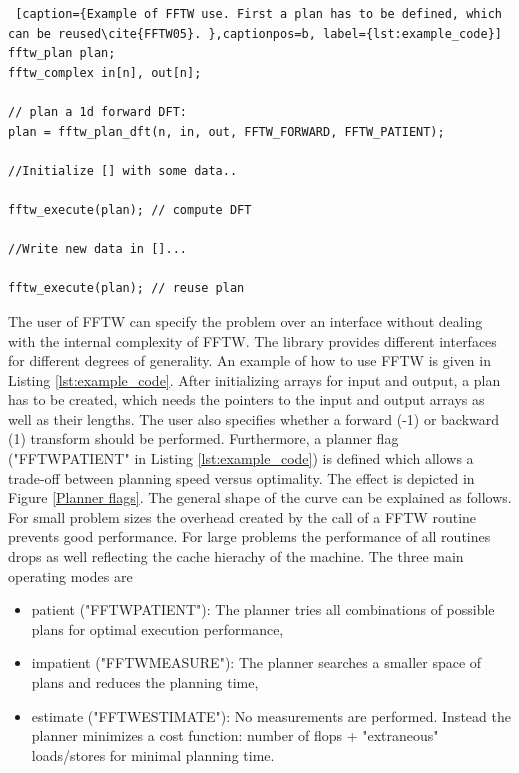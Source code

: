 \documentclass{usiinftr}
\begin{document}
\begin{lstlisting} [caption={Example of FFTW use. First a plan has to be defined, which can be reused\cite{FFTW05}. },captionpos=b, label={lst:example_code}]
fftw_plan plan;
fftw_complex in[n], out[n];

// plan a 1d forward DFT:
plan = fftw_plan_dft(n, in, out, FFTW_FORWARD, FFTW_PATIENT);

//Initialize [] with some data..

fftw_execute(plan); // compute DFT

//Write new data in []...

fftw_execute(plan); // reuse plan
\end{lstlisting}

The user of FFTW can specify the problem over an interface without dealing with the internal complexity of FFTW.
The library provides different interfaces for different degrees of generality.
An example of how to use FFTW is given in Listing \ref{lst:example_code}.
After initializing arrays for input and output, a plan has to be created, which needs the pointers to the input and output arrays as well as their lengths. 
The user also specifies whether a forward (-1) or backward (1) transform should be performed.
Furthermore, a planner flag  ("FFTW\textunderscore PATIENT" in Listing \ref{lst:example_code}) is defined which allows a trade-off between planning speed versus optimality. The effect is depicted in Figure \ref{Planner flags}.
The general shape of the curve can be explained as follows.
For small problem sizes the overhead created by the call of a FFTW routine prevents good performance.
For large problems the performance of all routines drops as well reflecting the cache hierachy of the machine\cite{FFTW05}. The three main operating modes are
\begin{itemize}
\item patient ("FFTW\textunderscore PATIENT"): The planner tries all combinations of possible plans for optimal execution performance,
\item impatient ("FFTW\textunderscore MEASURE"): The planner searches a smaller space of plans and reduces the planning time,
\item estimate ("FFTW\textunderscore ESTIMATE"): No measurements are performed. Instead the planner minimizes a cost function: number of flops + "extraneous" loads/stores for minimal planning time.
\end{itemize}
\end{document}
